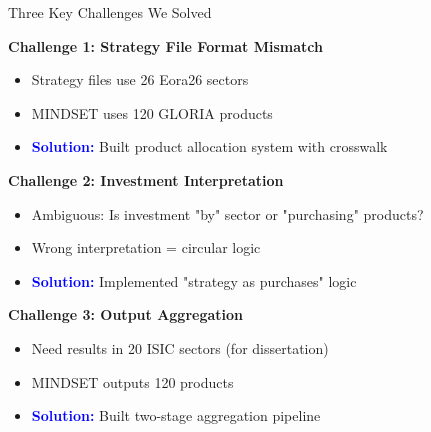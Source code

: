 \documentclass[10pt]{beamer}
\begin{document}
\begin{frame}{Three Key Challenges We Solved}

\textbf{Challenge 1: Strategy File Format Mismatch}
\begin{itemize}
    \item Strategy files use 26 Eora26 sectors
    \item MINDSET uses 120 GLORIA products
    \item \textcolor{blue}{\textbf{Solution:}} Built product allocation system with crosswalk
\end{itemize}

\vspace{0.4cm}

\textbf{Challenge 2: Investment Interpretation}
\begin{itemize}
    \item Ambiguous: Is investment "by" sector or "purchasing" products?
    \item Wrong interpretation = circular logic
    \item \textcolor{blue}{\textbf{Solution:}} Implemented "strategy as purchases" logic
\end{itemize}

\vspace{0.4cm}

\textbf{Challenge 3: Output Aggregation}
\begin{itemize}
    \item Need results in 20 ISIC sectors (for dissertation)
    \item MINDSET outputs 120 products
    \item \textcolor{blue}{\textbf{Solution:}} Built two-stage aggregation pipeline
\end{itemize}

\end{frame}

\end{document}
